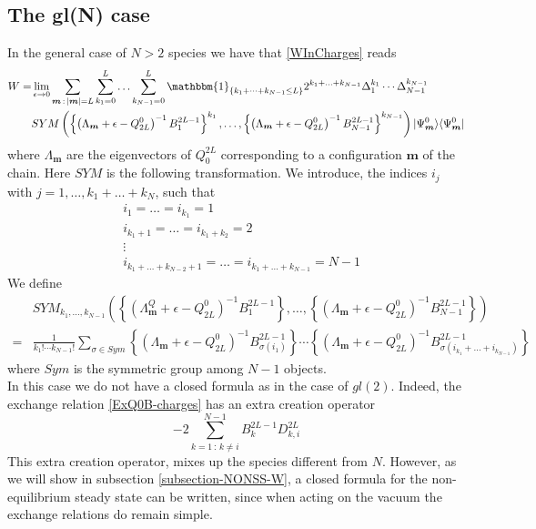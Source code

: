 \documentclass[10pt]{article}
\numberwithin{equation}{section}
\numberwithin{equation}{subsection}
\begin{document}
\subsection{The gl(N) case}\label{SubsectionGLN}
In the general case of $N>2$ species we have that \eqref{WInCharges} reads 
\begin{equation}\label{W-charges-Bad}
	\begin{split}
		W=&\lim_{\epsilon\to 0}\sum_{\bm{m}\,:\,|\bm{m}|=L}\sum_{k_{1}=0}^{L}\ldots\sum_{k_{N-1}=0}^{L}\mathbbm{1}_{\{k_{1}+\cdots+k_{N-1}\leq L\}}2^{k_{1}+\ldots+k_{N-1}}\Delta_{1}^{k_{1}}\cdots\Delta_{N-1}^{k_{N-1}}\\&SYM\left(\left\{\left(\Lambda_{\bm{m}}+\epsilon-Q_{2L}^{0}\right)^{-1}B_{1}^{2L-1}\right\}^{k_{1}},\ldots,\left\{\left(\Lambda_{\bm{m}}+\epsilon-Q_{2L}^{0}\right)^{-1}B_{N-1}^{2L-1}\right\}^{k_{N-1}}\right)
		|\Psi_{\bm{m}}^{0}\rangle \langle \Psi_{\bm{m}}^{0}|
	\end{split}
\end{equation}
where $\Lambda_{\bm{m}}$ are the eigenvectors of $Q_{0}^{2L}$ corresponding to a configuration $\bm{m}$ of the chain. Here $SYM$ is the following transformation. We introduce, the indices $i_{j}$ with $j=1,\ldots,k_{1}+\ldots+k_{N}$, such that 
\begin{equation}
	\begin{split}
		&i_{1}=\ldots=i_{k_{1}}=1\\
		&	i_{k_{1}+1}=\ldots=i_{k_{1}+k_{2}}=2\\
		&\vdots\\
		&i_{k_{1}+\ldots+k_{N-2}+1}=\ldots=i_{k_{1}+\ldots+k_{N-1}}=N-1
	\end{split}
\end{equation}
We define
\begin{equation}
	\begin{split}
		&SYM_{k_{1},\ldots,k_{N-1}}\left(\left\{\left(\Lambda_{\bm{m}}^{Q}+\epsilon-Q_{2L}^{0}\right)^{-1}B_{1}^{2L-1}\right\},\ldots,\left\{\left(\Lambda_{\bm{m}}+\epsilon-Q_{2L}^{0}\right)^{-1}B_{N-1}^{2L-1}\right\}\right)\\
		=&\frac{1}{k_{1}!\cdots k_{N-1}!}\sum_{\sigma\in Sym}\left\{\left(\Lambda_{\bm{m}}+\epsilon-Q_{2L}^{0}\right)^{-1}B_{\sigma(i_{1})}^{2L-1}\right\}\cdots \left\{\left(\Lambda_{\bm{m}}+\epsilon-Q_{2L}^{0}\right)^{-1}B_{\sigma(i_{k_{1}}+\ldots+i_{k_{N-1}})}^{2L-1}\right\}
	\end{split}
\end{equation}
where $Sym$ is the symmetric group among $N-1$ objects. \\
In this case we do not have a closed formula as in the case of $gl(2)$. Indeed, the exchange relation \eqref{ExQ0B-charges} has an extra creation operator
\begin{equation}
	-2\sum_{k=1\,:\,k\neq i}^{N-1}B_{k}^{2L-1}D_{k,i}^{2L}
\end{equation}
This extra creation operator, mixes up the species different from $N$.  However, as we will show in subsection \ref{subsection-NONSS-W}, a closed formula for the non-equilibrium steady state can be written, since when acting on the vacuum the exchange relations do remain simple. 
\end{document}
